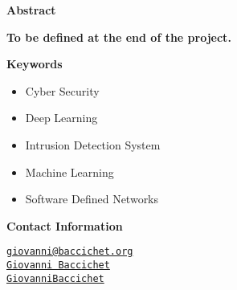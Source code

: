 \thispagestyle{empty}

{\bf\Huge Abstract}

\vspace{1cm}

\faEdit \quad \textbf{To be defined at the end of the project.} \\

\textcolor{dimgray}{\lipsum[1-3]}

\vspace{1cm}

{\bf\Huge Keywords}

\vspace{1cm}

\begin{itemize}
    \item[\faCaretRight] Cyber Security
    \item[\faCaretRight] Deep Learning
    \item[\faCaretRight] Intrusion Detection System
    \item[\faCaretRight] Machine Learning
    \item[\faCaretRight] Software Defined Networks
\end{itemize}

\vspace{1cm}

{\bf\Huge Contact Information}

\vspace{1cm}

\faEnvelopeO \quad \href{mailto:giovanni@baccichet.org}{\texttt{giovanni@baccichet.org}} \\

\faLinkedin \quad \href{https://www.linkedin.com/in/giovanni-baccichet/}{\texttt{Giovanni Baccichet}} \\

\faGithub \quad \href{https://github.com/GiovanniBaccichet}{\texttt{GiovanniBaccichet}}